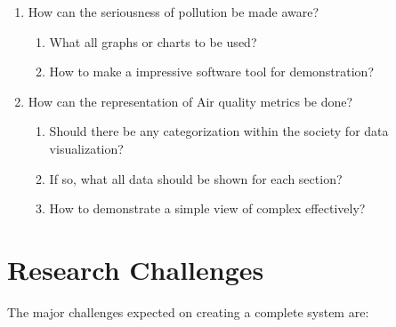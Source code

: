 \begin{enumerate}
\begin{enumerate}
   \end{enumerate}
  
 \item How can the seriousness of pollution be made aware?
 \begin{enumerate}
 \item What all graphs or charts to be used?
 \item How to make a impressive software tool for demonstration?
 \end{enumerate}
 
 \item How can the representation of Air quality metrics be done?
\begin{enumerate}
\item Should there be any categorization within the society for data visualization?
\item If so, what all data should be shown for each section?
\item How to demonstrate a simple view of complex effectively?
\end{enumerate}
 
 

 
 \end{enumerate}
 
\section{Research Challenges}


The major challenges expected on creating a complete system are:

